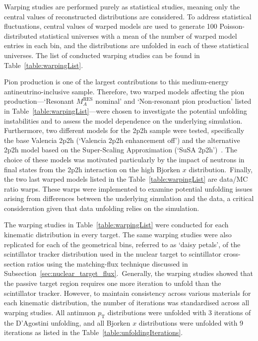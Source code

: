 Warping studies are performed purely as statistical studies, meaning only the central values of reconstructed distributions are considered. To address statistical fluctuations, central values of warped models are used to generate 100 Poisson-distributed statistical universes with a mean of the number of warped model entries in each bin, and the distributions are unfolded in each of these statistical universes. The list of conducted warping studies can be found in Table~\ref{table:warpingList}.

Pion production is one of the largest contributions to this medium-energy antineutrino-inclusive sample. Therefore, two warped models affecting the pion production---`Resonant $M_{A}^{\text{RES}}$ nominal' and `Non-resonant pion production' listed in Table~\ref{table:warpingList}---were chosen to investigate the potential unfolding instabilities and to assess the model dependence on the underlying simulation. Furthermore, two different models for the 2p2h sample were tested, specifically the base Valencia 2p2h (`Valencia 2p2h enhancement off') and the alternative 2p2h model based on the Super-Scaling Approximation (`SuSA 2p2h')~\cite{PhysRevD.94.093004}. The choice of these models was motivated particularly by the impact of neutrons in final states from the 2p2h interaction on the high Bjorken $x$ distribution.~Finally, the two last warped models listed in the Table~\ref{table:warpingList} are data/MC ratio warps. These warps were implemented to examine potential unfolding issues arising from differences between the underlying simulation and the data, a critical consideration given that data unfolding relies on the simulation.


The warping studies in Table~\ref{table:warpingList} were conducted for each kinematic distribution in every target. The same warping studies were also replicated for each of the geometrical bins, referred to as `daisy petals', of the scintillator tracker distribution used in the nuclear target to scintillator cross-section ratios using the matching-flux technique discussed in Subsection~\ref{sec:nuclear_target_flux}.~Generally, the warping studies showed that the passive target region requires one more iteration to unfold than the scintillator tracker. However, to maintain consistency across various materials for each kinematic distribution, the number of iterations was standardised across all warping studies. All antimuon $p_{\text{T}}$ distributions were unfolded with 3 iterations of the D'Agostini unfolding, and all Bjorken $x$ distributions were unfolded with 9 iterations as listed in the Table~\ref{table:unfoldingIterations}.


